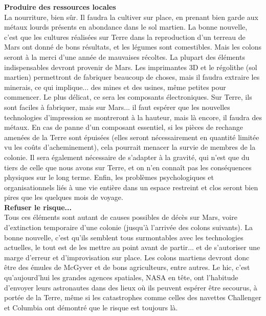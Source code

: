 \documentclass[8pt]{article}
\begin{document}
\textbf{Produire des ressources locales}\\

La nourriture, bien sûr. Il faudra la cultiver sur place, en prenant bien garde aux métaux lourds présents en abondance dans le sol martien. La bonne nouvelle, c'est que les cultures réalisées sur Terre dans la reproduction d'un terreau de Mars ont donné de bons résultats, et les légumes sont comestibles. Mais les colons seront à la merci d'une année de mauvaises récoltes. La plupart des éléments indispensables devront provenir de Mars. Les imprimantes 3D et le régolithe (sol martien) permettront de fabriquer beaucoup de choses, mais il faudra extraire les minerais, ce qui implique... des mines et des usines, même petites pour commencer. Le plus délicat, ce sera les composants électroniques. Sur Terre, ils sont faciles à fabriquer, mais sur Mars... il faut espérer que les nouvelles technologies d'impression se montreront à la hauteur, mais là encore, il faudra des métaux. En cas de panne d'un composant essentiel, si les pièces de rechange amenées de la Terre sont épuisées (elles seront nécessairement en quantité limitée vu les coûts d'acheminement), cela pourrait menacer la survie de membres de la colonie. Il sera également nécessaire de s'adapter à la gravité, qui n'est que du tiers de celle que nous avons sur Terre, et on n'en connaît pas les conséquences physiques sur le long terme. Enfin, les problèmes psychologiques et organisationnels liés à une vie entière dans un espace restreint et clos seront bien pires que les quelques mois de voyage.\\
\newpage
\textbf{Refuser le risque...}\\

Tous ces éléments sont autant de causes possibles de décès sur Mars, voire d'extinction temporaire d'une colonie (jusqu'à l'arrivée des colons suivants). La bonne nouvelle, c'est qu'ils semblent tous surmontables avec les technologies actuelles, le tout est de les mettre au point avant de partir... et de s'autoriser une marge d'erreur et d'improvisation sur place. Les colons martiens devront donc être des émules de McGyver et de bons agriculteurs, entre autres. Le hic, c'est qu'aujourd'hui les grandes agences spatiales, NASA en tête, ont l'habitude d'envoyer leurs astronautes dans des lieux où ils peuvent espérer être secourus, à portée de la Terre, même si les catastrophes comme celles des navettes Challenger et Columbia ont démontré que le risque est toujours là.\\
\end{document}
